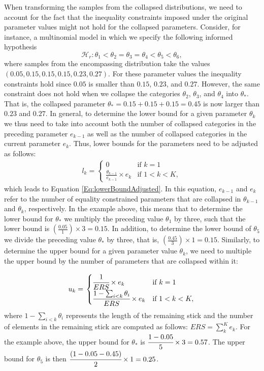 \begin{appendix}
When transforming the samples from the collapsed distributions, we need
to account for the fact that the inequality constraints imposed under
the original parameter values might not hold for the collapsed
parameters. Consider, for instance, a multinomial model in which we
specify the following informed hypothesis
\[\mathcal{H}_r: \theta_1 < \theta_2 = \theta_3 = \theta_4 < \theta_5 < \theta_6,\]
where samples from the encompassing distribution take the values
\((0.05, 0.15, 0.15, 0.15, 0.23, 0.27)\). For these parameter values the
inequality constraints hold since \(0.05\) is smaller than \(0.15\),
\(0.23\), and \(0.27\). However, the same constraint does not hold when
we collapse the categories \(\theta_2\), \(\theta_3\), and \(\theta_4\)
into \(\theta_*\). That is, the collapsed parameter
\(\theta_* = 0.15 + 0.15 + 0.15 = 0.45\) is now larger than \(0.23\) and
\(0.27\). In general, to determine the lower bound for a given parameter
\(\theta_k\) we thus need to take into account both the number of
collapsed categories in the preceding parameter \(e_{k-1}\) as well as
the number of collapsed categories in the current parameter \(e_{k}\).
Thus, lower bounds for the parameters need to be adjusted as follows:
\begin{align*}
l_k = \left.
\begin{cases}
0 & \text{if } k = 1 \\
\frac{\theta_{k - 1}}{e_{k-1}} \times e_k & \text{if } 1 < k < K,
\end{cases}
\right.
\end{align*} which leads to Equation \ref{Eq:lowerBoundAdjusted}. In
this equation, \(e_{k-1}\) and \(e_k\) refer to the number of equality
constrained parameters that are collapsed in \(\theta_{k - 1}\) and
\(\theta_{k}\), respectively. In the example above, this means that to
determine the lower bound for \(\theta_*\) we multiply the preceding
value \(\theta_1\) by three, such that the lower bound is
\(\left(\frac{0.05}{1}\right)\times 3 = 0.15\). In addition, to
determine the lower bound of \(\theta_5\) we divide the preceding value
\(\theta_*\) by three, that is,
\(\left(\frac{0.45}{3}\right) \times 1 = 0.15\). Similarly, to determine
the upper bound for a given parameter value \(\theta_{k}\), we need to
multiple the upper bound by the number of parameters that are collapsed
within it:

\begin{align}
u_k = \left.
\begin{cases}
\cfrac{1}{ERS} \times e_k & \text{if } k = 1 \\
\cfrac{1 - \sum_{i < k} \theta_i}{ERS} \times e_k & \text{if } 1 < k < K,
\end{cases}
\right.
\end{align} where \(1 - \sum_{i < k} \theta_i\) represents the length of
the remaining stick and the number of elements in the remaining stick
are computed as follows: \(ERS = \sum_k^{K} e_k\). For the example
above, the upper bound for \(\theta_*\) is
\(\cfrac{1 - 0.05}{5} \times 3 = 0.57\). The upper bound for
\(\theta_5\) is then \(\cfrac{(1 - 0.05 - 0.45)}{2} \times 1 = 0.25\).


\end{appendix}
